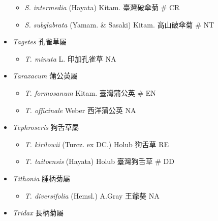 \begin{itemize}
  \begin{itemize}
        \item[] \textit{S. intermedia} (Hayata) Kitam.  臺灣破傘菊  \# CR
        \item[] \textit{S. subglabrata} (Yamam. \& Sasaki) Kitam.  高山破傘菊  \# NT
  \end{itemize}
 \item[] \textit{Tagetes} 孔雀草屬
                                
  \begin{itemize}
        \item[] \textit{T. minuta} L.  印加孔雀草   NA
  \end{itemize}
 \item[] \textit{Taraxacum} 蒲公英屬
                                
  \begin{itemize}
        \item[] \textit{T. formosanum} Kitam.  臺灣蒲公英  \# EN
        \item[] \textit{T. officinale} Weber  西洋蒲公英   NA
  \end{itemize}
 \item[] \textit{Tephroseris} 狗舌草屬
                                
  \begin{itemize}
        \item[] \textit{T. kirilowii} (Turcz. ex DC.) Holub  狗舌草   RE
        \item[] \textit{T. taitoensis} (Hayata) Holub  臺灣狗舌草  \# DD
  \end{itemize}
 \item[] \textit{Tithonia} 腫柄菊屬
                                
  \begin{itemize}
        \item[] \textit{T. diversifolia} (Hemsl.) A.Gray  王爺葵   NA
  \end{itemize}
 \item[] \textit{Tridax} 長柄菊屬
                                

\end{itemize}
